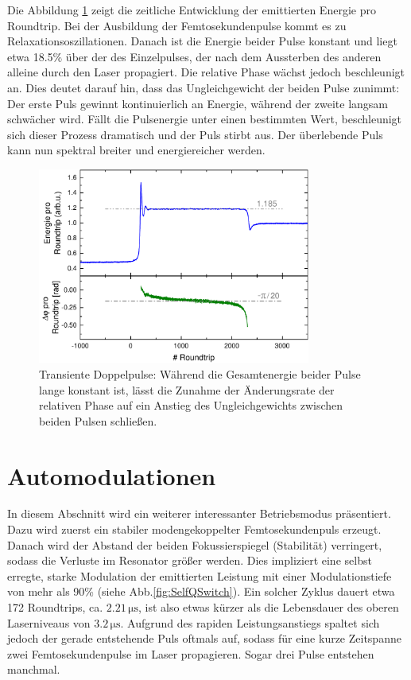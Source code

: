 \documentclass[bachelor,       %
               twoside,        %
               BCOR10mm,       %
               liststotoc,nomtotoc,bibtotoc, %
               english,ngerman, %
               final,          %
               ]{GAUBM}
\begin{document}
Die Abbildung \ref{fig:TransientSplittingAusw} zeigt die zeitliche Entwicklung der emittierten Energie pro Roundtrip.
Bei der Ausbildung der Femtosekundenpulse kommt es zu Relaxationsoszillationen.
Danach ist die Energie beider Pulse konstant und liegt etwa 18.5\% über der des Einzelpulses, der nach dem Aussterben des anderen alleine durch den Laser propagiert.
Die relative Phase wächst jedoch beschleunigt an.
Dies deutet darauf hin, dass das Ungleichgewicht der beiden Pulse zunimmt: Der erste Puls gewinnt kontinuierlich an Energie, während der zweite langsam schwächer wird.
Fällt die Pulsenergie unter einen bestimmten Wert, beschleunigt sich dieser Prozess dramatisch und der Puls stirbt aus.
Der überlebende Puls kann nun spektral breiter und energiereicher werden.
\begin{figure}[!htb]
	\centering
	\includegraphics[width=0.8\textwidth]{figures/TransientSplittingAusw}
	\caption{Transiente Doppelpulse: Während die Gesamtenergie beider Pulse lange konstant ist, lässt die Zunahme der Änderungsrate der relativen Phase auf ein Anstieg des Ungleichgewichts zwischen beiden Pulsen schließen.}
	\label{fig:TransientSplittingAusw}
\end{figure}

\clearpage
\section{Automodulationen}
In diesem Abschnitt wird ein weiterer interessanter Betriebsmodus präsentiert.
Dazu wird zuerst ein stabiler modengekoppelter Femtosekundenpuls erzeugt.
Danach wird der Abstand der beiden Fokussierspiegel (Stabilität) verringert, sodass die Verluste im Resonator größer werden.
Dies impliziert eine selbst erregte, starke Modulation der emittierten Leistung mit einer Modulationstiefe von mehr als 90\% (siehe Abb.\ref{fig:SelfQSwitch}).
Ein solcher Zyklus dauert etwa 172 Roundtrips, ca. $2.21\,\si{\micro\second}$, ist also etwas kürzer als die Lebensdauer des oberen Laserniveaus von $3.2\,\si{\micro\second}$.
Aufgrund des rapiden Leistungsanstiegs spaltet sich jedoch der gerade entstehende Puls oftmals auf, sodass für eine kurze Zeitspanne zwei Femtosekundenpulse im Laser propagieren.
Sogar drei Pulse entstehen manchmal.
\end{document}
